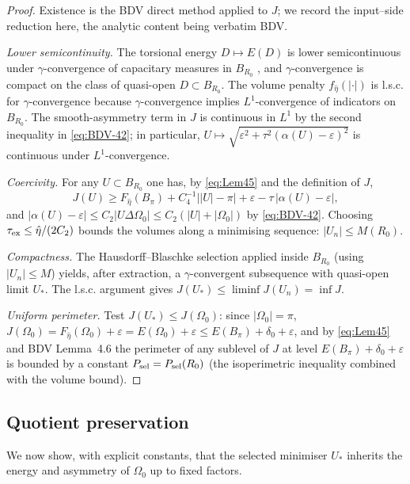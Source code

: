 \documentclass[11pt]{amsart}
\begin{document}
\begin{proof}
Existence is the BDV direct method applied to \(J\); we record the
input--side reduction here, the analytic content being verbatim BDV.

\emph{Lower semicontinuity.}  The torsional energy \(D\mapsto E(D)\) is
lower semicontinuous under \(\gamma\)-convergence of capacitary measures
in \(B_{R_0}\) \cite{BuDM}, and \(\gamma\)-convergence is
compact on the class of quasi-open \(D\subset B_{R_0}\).  The volume
penalty \(f_{\hat\eta}(|\cdot|)\) is l.s.c. for \(\gamma\)-convergence
because \(\gamma\)-convergence implies \(L^1\)-convergence of indicators
on \(B_{R_0}\).  The smooth-asymmetry term in \(J\) is continuous in
\(L^1\) by the second inequality in \eqref{eq:BDV-42}; in particular,
\(U\mapsto\sqrt{\varepsilon^{2}+\tau^{2}(\alpha(U)-\varepsilon)^{2}}\)
is continuous under \(L^1\)-convergence.

\emph{Coercivity.}  For any \(U\subset B_{R_0}\) one has, by
\eqref{eq:Lem45} and the definition of \(J\),
\[
   J(U)\ge F_{\hat\eta}(B_\pi)+C_4^{-1}\bigl||U|-\pi\bigr|
         +\varepsilon-\tau\,|\alpha(U)-\varepsilon|,
\]
and \(|\alpha(U)-\varepsilon|\le C_2|U\Delta\Omega_0|\le
C_2(|U|+|\Omega_0|)\) by \eqref{eq:BDV-42}.  Choosing
\(\tau_{\rm ex}\le\hat\eta/(2C_2)\) bounds the volumes along a minimising
sequence: \(|U_n|\le M(R_0)\).

\emph{Compactness.}  The Hausdorff--Blaschke selection applied inside
\(B_{R_0}\) (using \(|U_n|\le M\)) yields, after extraction, a
\(\gamma\)-convergent subsequence with quasi-open limit \(U_*\).  The
l.s.c. argument gives \(J(U_*)\le\liminf J(U_n)=\inf J\).

\emph{Uniform perimeter.}  Test \(J(U_*)\le J(\Omega_0)\): since
\(|\Omega_0|=\pi\),
\(J(\Omega_0)=F_{\hat\eta}(\Omega_0)+\varepsilon=E(\Omega_0)+\varepsilon
\le E(B_\pi)+\delta_0+\varepsilon\), and by \eqref{eq:Lem45} and BDV
Lemma~4.6 the perimeter of any sublevel of \(J\) at level
\(E(B_\pi)+\delta_0+\varepsilon\) is bounded by a constant
\(P_{\rm sel}=P_{\rm sel}(R_0)\) (the isoperimetric inequality combined
with the volume bound).
\end{proof}

\subsection{Quotient preservation}\label{ss:quotient}

We now show, with explicit constants, that the selected minimiser
\(U_*\) inherits the energy and asymmetry of \(\Omega_0\) up to fixed
factors.
\end{document}
